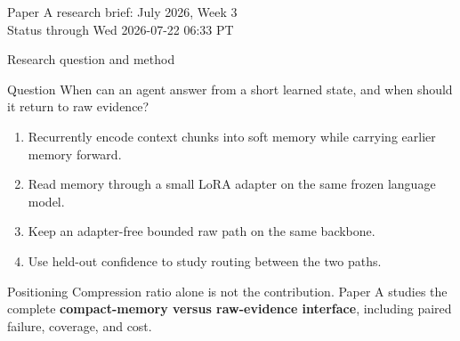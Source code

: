
\begin{frame}
  \titlepage
  \vspace{-1.0em}
  \begin{center}
    \small Paper A research brief: July 2026, Week 3 \\
    \scriptsize Status through Wed 2026-07-22 06:33 PT
  \end{center}
\end{frame}

\begin{frame}{Research question and method}
  \begin{block}{Question}
    When can an agent answer from a short learned state, and when should it return to raw evidence?
  \end{block}
  \begin{enumerate}\small
    \item Recurrently encode context chunks into soft memory while carrying earlier memory forward.
    \item Read memory through a small LoRA adapter on the same frozen language model.
    \item Keep an adapter-free bounded raw path on the same backbone.
    \item Use held-out confidence to study routing between the two paths.
  \end{enumerate}
  \begin{block}{Positioning}
    \footnotesize Compression ratio alone is not the contribution. Paper A studies the complete
    \textbf{compact-memory versus raw-evidence interface}, including paired failure, coverage, and cost.
  \end{block}
\end{frame}

